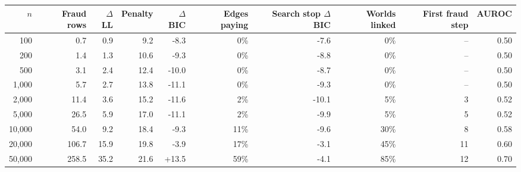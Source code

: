\begin{tabular}{rrrrrrrrrr}\toprule
$n$ & Fraud rows & $\Delta$LL & Penalty & $\Delta$BIC & Edges paying & Search stop $\Delta$BIC & Worlds linked & First fraud step & AUROC\\\midrule
100 & 0.7 & 0.9 & 9.2 & -8.3 & 0\% & -7.6 & 0\% & -- & 0.50\\
200 & 1.4 & 1.3 & 10.6 & -9.3 & 0\% & -8.8 & 0\% & -- & 0.50\\
500 & 3.1 & 2.4 & 12.4 & -10.0 & 0\% & -8.7 & 0\% & -- & 0.50\\
1,000 & 5.7 & 2.7 & 13.8 & -11.1 & 0\% & -9.3 & 0\% & -- & 0.50\\
2,000 & 11.4 & 3.6 & 15.2 & -11.6 & 2\% & -10.1 & 5\% & 3 & 0.52\\
5,000 & 26.5 & 5.9 & 17.0 & -11.1 & 2\% & -9.9 & 5\% & 5 & 0.52\\
10,000 & 54.0 & 9.2 & 18.4 & -9.3 & 11\% & -9.6 & 30\% & 8 & 0.58\\
20,000 & 106.7 & 15.9 & 19.8 & -3.9 & 17\% & -3.1 & 45\% & 11 & 0.60\\
50,000 & 258.5 & 35.2 & 21.6 & +13.5 & 59\% & -4.1 & 85\% & 12 & 0.70\\
\bottomrule\end{tabular}